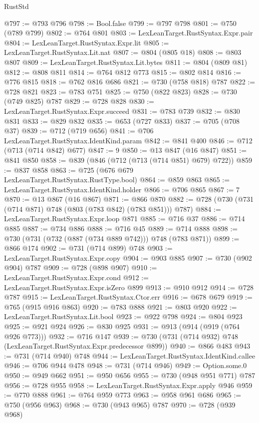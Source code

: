 \begin{lexlean}{RustStd}
\begin{coremodule}
@797 := @793 @796
@798 := Bool.false
@799 := @797 @798
@801 := @750 (@789 @799)
@802 := @764 @801
@803 := LexLeanTarget.RustSyntax.Expr.pair
@804 := LexLeanTarget.RustSyntax.Expr.lit
@805 := LexLeanTarget.RustSyntax.Lit.nat
@807 := @804 (@805 @18)
@808 := @803 @807
@809 := LexLeanTarget.RustSyntax.Lit.bytes
@811 := @804 (@809 @81)
@812 := @808 @811
@814 := @764 @812 @773
@815 := @802 @814
@816 := @776 @815
@818 := @762 @816 @686
@821 := @730 (@758 @818) @787
@822 := @728 @821
@823 := @783 @751
@825 := @750 (@822 @823)
@828 := @730 (@749 @825) @787
@829 := @728 @828
@830 := LexLeanTarget.RustSyntax.Expr.succeed
@831 := @783 @739
@832 := @830 @831
@833 := @829 @832
@835 := @653 (@727 @833)
@837 := @705 (@708 @37)
@839 := @712 (@719 @656)
@841 := @706 LexLeanTarget.RustSyntax.IdentKind.param
@842 := @841 @400
@846 := @712 (@713 (@714 @842) @677)
@847 := 9
@850 := @13 @847 (@16 @847)
@851 := @841 @850
@858 := @839 (@846 (@712 (@713 (@714 @851) @679) @722))
@859 := @837 @858
@863 := @725 (@676 @679 LexLeanTarget.RustSyntax.RustType.bool)
@864 := @859 @863
@865 := LexLeanTarget.RustSyntax.IdentKind.holder
@866 := @706 @865
@867 := 7
@870 := @13 @867 (@16 @867)
@871 := @866 @870
@882 := @728 (@730 (@731 (@714 @871) @748 (@803 (@783 @842) (@783 @851))) @787)
@884 := LexLeanTarget.RustSyntax.Expr.loop @871
@885 := @716 @37
@886 := @714 @885
@887 := @734 @886
@888 := @716 @45
@889 := @714 @888
@898 := @730 (@731 (@732 (@887 (@734 @889 @742))) @748 (@783 @871))
@899 := @866 @174
@902 := @731 (@714 @899) @748
@903 := LexLeanTarget.RustSyntax.Expr.copy
@904 := @903 @885
@907 := @730 (@902 @904) @787
@909 := @728 (@898 @907)
@910 := LexLeanTarget.RustSyntax.Expr.cond
@912 := LexLeanTarget.RustSyntax.Expr.isZero @899
@913 := @910 @912
@914 := @728 @787
@915 := LexLeanTarget.RustSyntax.Ctor.err
@916 := @678 @679
@919 := @765 (@915 @916 @863)
@920 := @783 @888
@921 := @803 @920
@922 := LexLeanTarget.RustSyntax.Lit.bool
@923 := @922 @798
@924 := @804 @923
@925 := @921 @924
@926 := @830 @925
@931 := @913 (@914 (@919 (@764 @926 @773)))
@932 := @716 @147
@939 := @730 (@731 (@714 @932) @748 (LexLeanTarget.RustSyntax.Expr.predecessor @899))
@940 := @866 @483
@943 := @731 (@714 @940) @748
@944 := LexLeanTarget.RustSyntax.IdentKind.callee
@946 := @706 @944 @478
@948 := @731 (@714 @946)
@949 := Option.some.{0}
@950 := @949 @662
@951 := @950 @656
@955 := @730 (@948 @951 @771) @787
@956 := @728 @955
@958 := LexLeanTarget.RustSyntax.Expr.apply @946
@959 := @770 @888
@961 := @764 @959 @773
@963 := @958 @961 @686
@965 := @750 (@956 @963)
@968 := @730 (@943 @965) @787
@970 := @728 (@939 @968)

\end{coremodule}
\end{lexlean}
